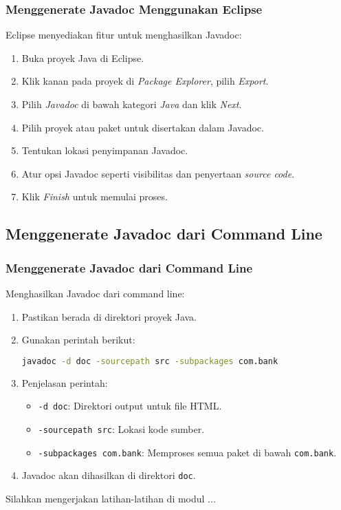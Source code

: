 \documentclass[aspectratio=169, table]{beamer}
\begin{document}
\begin{frame}
\frametitle{Menggenerate Javadoc Menggunakan Eclipse}
Eclipse menyediakan fitur untuk menghasilkan Javadoc:
\begin{enumerate}
	\item Buka proyek Java di Eclipse.
	\item Klik kanan pada proyek di \textit{Package Explorer}, pilih \textit{Export}.
	\item Pilih \textit{Javadoc} di bawah kategori \textit{Java} dan klik \textit{Next}.
	\item Pilih proyek atau paket untuk disertakan dalam Javadoc.
	\item Tentukan lokasi penyimpanan Javadoc.
	\item Atur opsi Javadoc seperti visibilitas dan penyertaan \textit{source code}.
	\item Klik \textit{Finish} untuk memulai proses.
\end{enumerate}
\end{frame}

\subsection{Menggenerate Javadoc dari Command Line}

\begin{frame}[fragile]
\frametitle{Menggenerate Javadoc dari Command Line}
Menghasilkan Javadoc dari command line:
\begin{enumerate}
	\item Pastikan berada di direktori proyek Java.
	\item Gunakan perintah berikut:
	\begin{lstlisting}[language=bash]
		javadoc -d doc -sourcepath src -subpackages com.bank
	\end{lstlisting}
	\item Penjelasan perintah:
	\begin{itemize}
		\item \texttt{-d doc}: Direktori output untuk file HTML.
		\item \texttt{-sourcepath src}: Lokasi kode sumber.
		\item \texttt{-subpackages com.bank}: Memproses semua paket di bawah \texttt{com.bank}.
	\end{itemize}
	\item Javadoc akan dihasilkan di direktori \texttt{doc}.
\end{enumerate}
\end{frame}

\begin{frame}
\centering
\Huge Silahkan mengerjakan latihan-latihan di modul ...
\end{frame}
\end{document}
